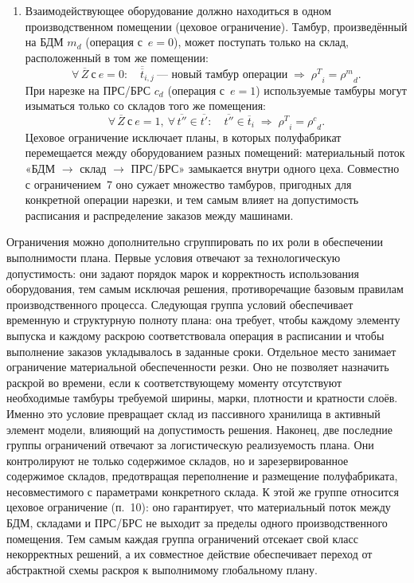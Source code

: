 \begin{enumerate}
    \item Взаимодействующее оборудование должно находиться в одном производственном помещении (цеховое ограничение).
    Тамбур, произведённый на БДМ $m_d$ (операция с~$e=0$), может поступать только на склад, расположенный в том же помещении:
    \[
    \forall\,\overline{Z}\ \text{с}\ e = 0:\quad {\overline{\overline{t}}}_{i,j} \ \text{--- новый тамбур операции} \;\Rightarrow\; {\rho^T}_{i} = {\rho^m}_{d}.
    \]
    При нарезке на ПРС/БРС $c_d$ (операция с~$e=1$) используемые тамбуры могут изыматься только со складов того же помещения:
    \[
    \forall\,\overline{Z}\ \text{с}\ e = 1,\ \forall\,{\overline{t''}} \in \overline{t'}:\quad {\overline{t''}} \in {\overline{t}}_{i} \;\Rightarrow\; {\rho^T}_{i} = {\rho^c}_{d}.
    \]
    Цеховое ограничение исключает планы, в которых полуфабрикат перемещается между оборудованием разных помещений: материальный поток «БДМ $\to$ склад $\to$ ПРС/БРС» замыкается внутри одного цеха. Совместно с ограничением~7 оно сужает множество тамбуров, пригодных для конкретной операции нарезки, и тем самым влияет на допустимость расписания и распределение заказов между машинами.
\end{enumerate}
Ограничения можно дополнительно сгруппировать по их роли в обеспечении выполнимости плана. Первые условия отвечают за технологическую допустимость: они задают порядок марок и корректность использования оборудования, тем самым исключая решения, противоречащие базовым правилам производственного процесса. Следующая группа условий обеспечивает временную и структурную полноту плана: она требует, чтобы каждому элементу выпуска и каждому раскрою соответствовала операция в расписании и чтобы выполнение заказов укладывалось в заданные сроки.
Отдельное место занимает ограничение материальной обеспеченности резки. Оно не позволяет назначить раскрой во времени, если к соответствующему моменту отсутствуют необходимые тамбуры требуемой ширины, марки, плотности и кратности слоёв. Именно это условие превращает склад из пассивного хранилища в активный элемент модели, влияющий на допустимость решения.
Наконец, две последние группы ограничений отвечают за логистическую реализуемость плана. Они контролируют не только содержимое складов, но и зарезервированное содержимое складов, предотвращая переполнение и размещение полуфабриката, несовместимого с параметрами конкретного склада. К этой же группе относится цеховое ограничение (п.~10): оно гарантирует, что материальный поток между БДМ, складами и ПРС/БРС не выходит за пределы одного производственного помещения. Тем самым каждая группа ограничений отсекает свой класс некорректных решений, а их совместное действие обеспечивает переход от абстрактной схемы раскроя к выполнимому глобальному плану.

